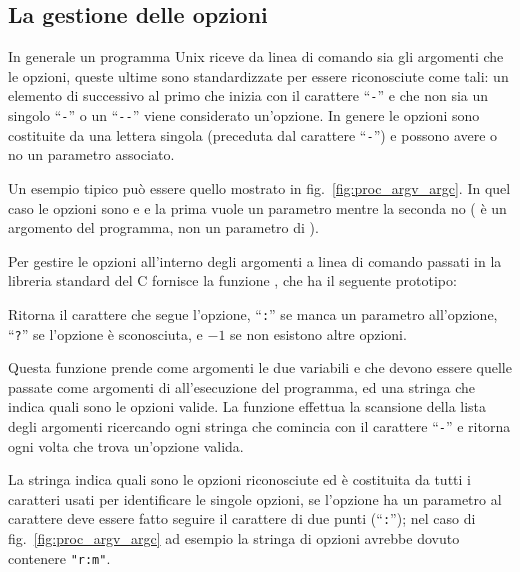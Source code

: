 \subsection{La gestione delle opzioni}
\label{sec:proc_opt_handling}

In generale un programma Unix riceve da linea di comando sia gli argomenti che
le opzioni, queste ultime sono standardizzate per essere riconosciute come
tali: un elemento di  successivo al primo che inizia con il
carattere ``\texttt{-}'' e che non sia un singolo ``\texttt{-}'' o un
``\texttt{-{}-}'' viene considerato un'opzione.  In genere le opzioni sono
costituite da una lettera singola (preceduta dal carattere ``\texttt{-}'') e
possono avere o no un parametro associato.

Un esempio tipico può essere quello mostrato in
fig.~\ref{fig:proc_argv_argc}. In quel caso le opzioni sono  e
 e la prima vuole un parametro mentre la seconda no
( è un argomento del programma, non un parametro di
).

Per gestire le opzioni all'interno degli argomenti a linea di comando passati
in  la libreria standard del C fornisce la funzione
, che ha il seguente prototipo:

\begin{funcproto}{ 
}
{Ritorna il carattere che segue l'opzione, ``\texttt{:}'' se manca un
  parametro all'opzione, ``\texttt{?}'' se l'opzione è sconosciuta, e $-1$ se
  non esistono altre opzioni.} 
\end{funcproto}

Questa funzione prende come argomenti le due variabili  e
 che devono essere quelle passate come argomenti di 
all'esecuzione del programma, ed una stringa  che indica
quali sono le opzioni valide. La funzione effettua la scansione della lista
degli argomenti ricercando ogni stringa che comincia con il carattere
``\texttt{-}'' e ritorna ogni volta che trova un'opzione valida.

La stringa  indica quali sono le opzioni riconosciute ed è
costituita da tutti i caratteri usati per identificare le singole opzioni, se
l'opzione ha un parametro al carattere deve essere fatto seguire il carattere
di due punti (``\texttt{:}''); nel caso di fig.~\ref{fig:proc_argv_argc} ad
esempio la stringa di opzioni avrebbe dovuto contenere \texttt{"r:m"}.

